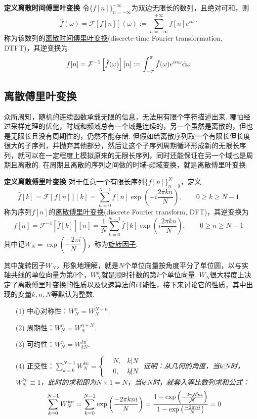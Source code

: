 \documentclass[UTF8]{ctexart}
\newcommand{\trm}[1]{{\rm #1}}
\newenvironment{definition}[1]
    {\begin{tcolorbox}[enhanced, colback=LightYellow, breakable=false, frame hidden, borderline west={1.5mm}{-2mm}{DarkGreen}]
    {\bfseries {\color{DarkGreen} 定义}\quad #1} \newline}
    {\end{tcolorbox}}
\begin{document}
\begin{definition}{离散时间傅里叶变换}
    令\(\{f[n]\}_{n=-\infty}^{+\infty}\)为双边无限长的数列，且绝对可和，则
    \[\hat{f}(\omega)=\mathcal{F}\left[f[n]\right](\omega):=\sum_{n=-\infty}^{+\infty}f[n]e^{in\omega}\]
    称为该数列的\uline{离散时间傅里叶变换}(discrete-time Fourier transformation, DTFT)，其逆变换为
    \[f[n]=\mathcal{F}^{-1}\left[\hat{f}(\omega)\right][n]:=\int_{-\pi}^{\pi}\hat{f}(\omega)e^{in\omega}\trm{d}\omega\] 
\end{definition}

\subsection{离散傅里叶变换}

众所周知，随机的连续函数承载无限的信息，无法用有限个字符描述出来. 哪怕经过采样定理的优化，时域和频域总有一个域是连续的，另一个虽然是离散的，但也是无限长且没有周期性的，仍然不能存储. 但假如给离散序列取一个有限长但长度很大的子序列，并抛弃其他部分，然后让这个子序列周期循环形成新的无限长序列，就可以在一定程度上模拟原来的无限长序列，同时还能保证在另一个域也是周期且离散的. 在周期且离散的序列之间做的时域-频域变换，就是离散傅里叶变换.

\begin{definition}{离散傅里叶变换}
    对于任意一个有限长序列\(\{f[n]\}_{n=0}^{N}\)，定义
    \[\hat{f}[k]=\mathcal{F}[f[n]][k] = \sum_{n=0}^{N-1}f[n]\exp\left(-i\frac{2\pi kn}{N}\right), \qquad 0 \geq k \geq N-1\]
    称为序列\(f[n]\)的\uline{离散傅里叶变换}(discrete Fourier transform, DFT)，其逆变换为
    \[f[n] = \mathcal{F}^{-1}\left[\hat{f}[k]\right][n] = \frac{1}{N}\sum_{k=0}^{N-1}\hat{f}[k]\exp\left(i\frac{2\pi kn}{N}\right), \qquad 0 \geq n \geq N-1\]
    其中记\(W_{N}=\exp\left(\dfrac{-2\pi i}{N}\right)\)，称为\uline{旋转因子}.
\end{definition}

其中旋转因子\(W_{N}\)，形象地理解，就是\(N\)个单位向量按角度平分了单位圆，以与实轴共线的单位向量为第\(0\)个，\(W_N^k\)就是顺时针数的第\(k\)个单位向量. \(W_N\)很大程度上决定了离散傅里叶变换的性质以及快速算法的可能性，接下来讨论它的性质，其中出现的变量\(k,n,N\)等默认为整数.
\begin{itemize}
    \item [(1)] 中心对称性：\(\overline{W_N^n}=W_N^{N-n}\).
    \item [(2)] 周期性：\(W_N^n=W_N^{n+N}\).
    \item [(3)] 可约性：\(W_N^n=W_{kN}^{kn}\).
    \item [(4)] 正交性：\(\displaystyle{\sum_{k=0}^{N-1}W_N^{kn}=\left\{\begin{aligned} &N,&k|N \\ &0,&k\not | N\end{aligned}\right.}\)
    \newline
    \textit{
        证明：从几何的角度，当\(k|N\)时，\(W_N^{kn}\equiv 1\)，此时的求和即为\(N\times 1=N\)，当\(k\not|N\)时，就套入等比数列求和公式：
        \[\sum_{k=0}^{N-1}W_N^{kn}=\sum_{k=0}^{N-1}\exp\left(\frac{-2\pi kni}{N}\right)=\frac{1-\exp\left(\frac{-2\pi \cancel{N} ni}{\cancel N}\right)}{1-\exp\left(\frac{-2\pi ni}{N}\right)}=0\]
    }
\end{itemize}
\end{document}
